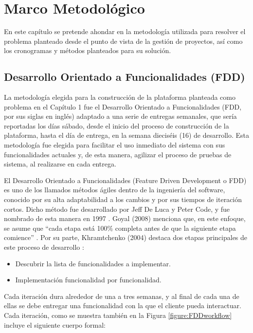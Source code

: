 \chapter{Marco Metodológico}

En este capítulo se pretende ahondar en la metodología utilizada para resolver el problema planteado desde el punto de vista de la gestión de proyectos, así como los cronogramas y métodos planteados para su solución.


\section{Desarrollo Orientado a Funcionalidades (FDD)}

La metodología elegida para la construcción de la plataforma planteada como problema en el Capítulo 1 fue el Desarrollo Orientado a Funcionalidades (FDD, por sus siglas en inglés) adaptado a una serie de entregas semanales, que sería reportadas los días sábado, desde el inicio del proceso de construcción de la plataforma, hasta el día de entrega, en la semana dieciséis (16) de desarrollo. Esta metodología fue elegida para facilitar el uso inmediato del sistema con sus funcionalidades actuales y, de esta manera, agilizar el proceso de pruebas de sistema, al realizarse en cada entrega.

El Desarrollo Orientado a Funcionalidades (Feature Driven Development o FDD) es uno de los llamados métodos ágiles dentro de la ingeniería del software, conocido por su alta adaptabilidad a los cambios y por sus tiempos de iteración cortos. Dicho método fue desarrollado por Jeff De Luca y Peter Code, y fue nombrado de esta manera en 1997 \cite{fdd}.
Goyal (2008) menciona que, en este enfoque, se asume que “cada etapa está 100\% completa antes de que la siguiente etapa comience” \cite{goyal2008}.
Por su parte, Khramtchenko (2004) destaca dos etapas principales de este proceso de desarrollo \cite{khramtchenko2004comparing}:
\begin{itemize}
    \item Descubrir la lista de funcionalidades a implementar.
    \item Implementación funcionalidad por funcionalidad.
\end{itemize}

Cada iteración dura alrededor de una a tres semanas, y al final de cada una de ellas se debe entregar una funcionalidad con la que el cliente pueda interactuar. Cada iteración, como se muestra también en la Figura \ref{figure:FDDworkflow} incluye el siguiente cuerpo formal:

